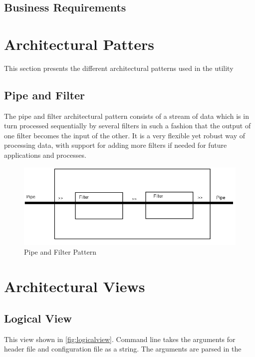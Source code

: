 \subsection{Business Requirements}


\section{Architectural Patters}
This section presents the different architectural patterns used in the utility
\subsection{Pipe and Filter}
The pipe and filter architectural pattern consists of a stream of data which is in turn processed sequentially by several filters in such a fashion that the output of one filter becomes the input of the other. It is a very flexible yet robust way of processing data, with support for adding more filters if needed for future applications and processes.
\begin{figure}[ht]
\includegraphics[width = \textwidth]{./planning/img/PipeAndFilter}
\caption{Pipe and Filter Pattern} 
\label{fig:pipefilter}
\end{figure}

\section{Architectural Views}

\subsection{Logical View}
This view shown in \autoref{fig:logicalview}. Command line takes the arguments for header file and configuration file as a string. The arguments are parsed in the 

